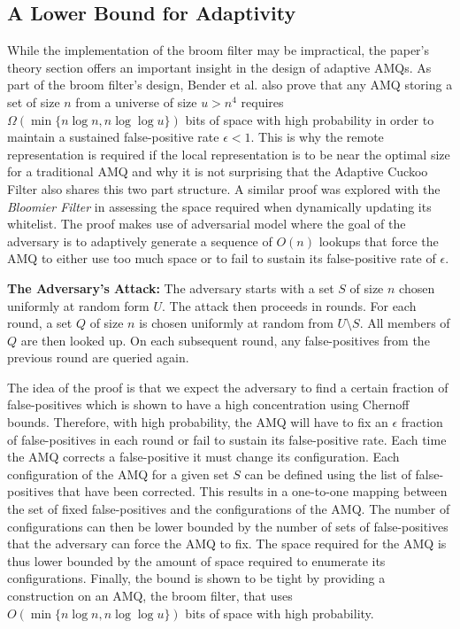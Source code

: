 \documentclass[../paper.tex]{subfiles}
\begin{document}
\subsection{A Lower Bound for Adaptivity} While the
implementation of the broom filter may be impractical, the paper's theory
section offers an important insight in the design of adaptive AMQs. As part of the broom filter's design,
Bender et al. also prove that any AMQ storing a set of size $n$ from a universe
of size $u > n^4$ requires $\Omega (\min \{n\log n, n\log\log u\})$ bits of
space with high probability in order to maintain a sustained false-positive
rate $\epsilon < 1$.  This is why the remote representation is required if the
local representation is to be near the optimal size for a traditional AMQ and
why it is not surprising that the Adaptive Cuckoo Filter also shares this two
part structure.  A similar proof was explored with the {\it Bloomier Filter} 
\cite{bloomier-filter} in assessing the space required when dynamically 
updating its whitelist. The proof makes use of adversarial model where the 
goal of the adversary is to adaptively generate a sequence of $O(n)$ lookups 
that force the AMQ to either use too much space or to fail to sustain its 
false-positive rate of $\epsilon$.  
	
	{\bf The Adversary's Attack:} The adversary starts with a set $S$ of size $n$ chosen
	uniformly at random form $U$.  The attack then proceeds in rounds.  For each round, 
	a set $Q$ of size $n$ is chosen uniformly at random from $U\setminus S$.  All members
	of $Q$ are then looked up. On each subsequent round, any false-positives from the 
	previous round are queried again. 
	
	The idea of the proof is that we expect the adversary to find a certain 
	fraction of false-positives which is shown to have a high concentration using Chernoff
	bounds.  Therefore, with high probability, the AMQ will have to fix an $\epsilon$ fraction
	of false-positives in each round or fail to sustain its false-positive rate.  Each time the 
	AMQ corrects a false-positive it must change its configuration.  Each configuration of the 
	AMQ for a given set $S$ can be defined using the list of false-positives that have been
	corrected.  This results in a one-to-one mapping between the set of fixed false-positives 
	and the configurations of the AMQ.  The number of configurations can then be lower 
	bounded by the number of sets of false-positives that the adversary can force the AMQ
	to fix.  The space required for the AMQ is thus lower bounded by the amount of space 
	required to enumerate its configurations.  Finally, the bound is shown to be tight by 
	providing a construction on an AMQ, the broom filter, that uses $O(\min \{n\log n, 
	n\log\log u\})$ bits of space with high probability. 
\end{document}

